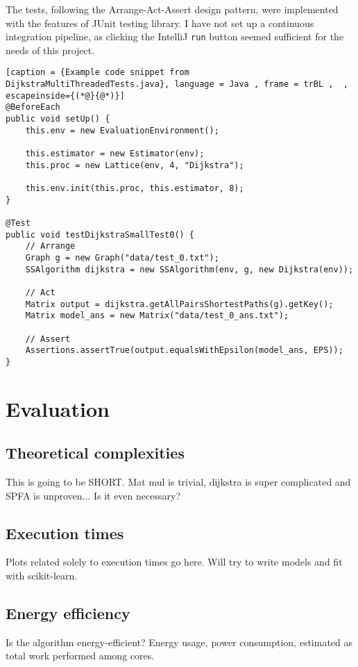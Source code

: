\documentclass[12pt,a4paper,twoside,openright]{report}
\begin{document}
The tests, following the Arrange-Act-Assert design pattern, were implemented with the features of JUnit testing library. I have not set up a continuous integration pipeline, as clicking the IntelliJ \texttt{run} button seemed sufficient for the needs of this project.

\begin{lstlisting}[caption = {Example code snippet from DijkstraMultiThreadedTests.java}, language = Java , frame = trBL ,  , escapeinside={(*@}{@*)}]
@BeforeEach
public void setUp() {
    this.env = new EvaluationEnvironment();
    
    this.estimator = new Estimator(env);
    this.proc = new Lattice(env, 4, "Dijkstra");
    
    this.env.init(this.proc, this.estimator, 8);
}
    
@Test
public void testDijkstraSmallTest0() {
    // Arrange
    Graph g = new Graph("data/test_0.txt");
    SSAlgorithm dijkstra = new SSAlgorithm(env, g, new Dijkstra(env));

    // Act
    Matrix output = dijkstra.getAllPairsShortestPaths(g).getKey();
    Matrix model_ans = new Matrix("data/test_0_ans.txt");

    // Assert
    Assertions.assertTrue(output.equalsWithEpsilon(model_ans, EPS));
}

\end{lstlisting}
\chapter{Evaluation}
\section{Theoretical complexities}
This is going to be SHORT. Mat mul is trivial, dijkstra is super complicated and SPFA is unproven... Is it even necessary? 

\section{Execution times}
Plots related solely to execution times go here. Will try to write models and fit with scikit-learn.

\section{Energy efficiency}
Is the algorithm energy-efficient? Energy usage, power consumption, estimated as total work performed among cores.
\end{document}
